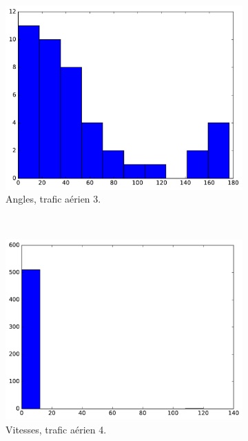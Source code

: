 \begin{appendices}
\begin{figure}[htbp]
\begin{subfigure}[t]{\subImgWclicks}
			\centering
			\includegraphics[width=\textwidth]{figures/ch3/hkg_angle}
			\caption{Angles, trafic aérien 3.}
			\label{fig:hkg_angle}
		\end{subfigure}
		~
		\begin{subfigure}[t]{\subImgWclicks}
			\centering
			\includegraphics[width=\textwidth]{figures/ch3/flightradar2a_filteredSpeed}
			\caption{Vitesses, trafic aérien 4.}
			\label{fig:flightradar2a_filteredSpeed}
		\end{subfigure}
		~
		\begin{subfigure}[t]{\subImgWclicks}
			\centering

\end{subfigure}
\end{figure}
\end{appendices}
